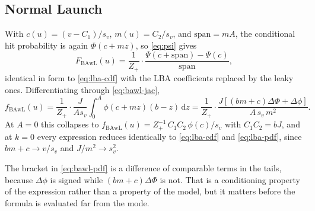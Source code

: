 \documentclass[12pt]{article}
\newcommand{\dd}{\,\mathrm{d}}
\newcommand{\PhiN}{\Phi}
\newcommand{\phiN}{\phi}
\theoremstyle{remark}
\begin{document}
\subsection{Normal Launch}
With $c(u) = (v - C_1)/s_v$, $m(u) = C_2/s_v$, and $\mathrm{span} = mA$, the conditional hit probability is again $\PhiN(c + mz)$, so \eqref{eq:psi} gives
\begin{equation}
  F_{\mathrm{BAwL}}(u)
  = \frac{1}{Z_+}\cdot\frac{\Psi(c+\mathrm{span}) - \Psi(c)}{\mathrm{span}},
  \label{eq:bawl-cdf}
\end{equation}
identical in form to \eqref{eq:lba-cdf} with the LBA coefficients replaced by the leaky ones. Differentiating through \eqref{eq:bawl-jac},
\begin{equation}
  f_{\mathrm{BAwL}}(u)
  = \frac{1}{Z_+}\cdot\frac{J}{A s_v}\int_0^A \phiN(c+mz)(b-z)\dd z
  = \frac{1}{Z_+}\cdot
    \frac{J\left[(bm+c)\Delta\PhiN + \Delta\phiN\right]}{A\,s_v\,m^2}.
  \label{eq:bawl-pdf}
\end{equation}
At $A = 0$ this collapses to $f_{\mathrm{BAwL}}(u) = Z_+^{-1}\,C_1C_2\,\phiN(c)/s_v$ with $C_1C_2 = bJ$, and at $k=0$ every expression reduces identically to \eqref{eq:lba-cdf} and
\eqref{eq:lba-pdf}, since $bm + c \to v/s_v$ and $J/m^2 \to s_v^2$.

The bracket in \eqref{eq:bawl-pdf} is a difference of comparable terms in the tails, because $\Delta\phiN$ is signed while $(bm+c)\Delta\PhiN$ is not. That is a conditioning property of the expression rather than a property of the model, but it matters before the formula is evaluated far from the mode.
\end{document}

